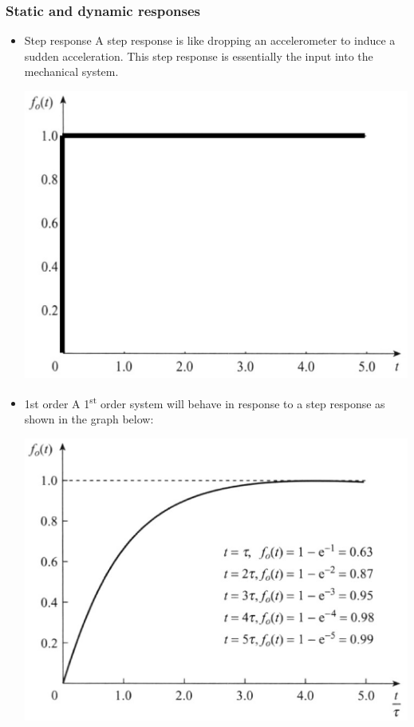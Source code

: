 \documentclass[11pt]{article}
\begin{document}
\subsubsection{Static and dynamic responses}
\label{sec:orgfb9a5f6}
\begin{itemize}
\item Step response
A step response is like dropping an accelerometer to induce a sudden acceleration. This step response is essentially the input into the mechanical system.

\begin{center}
\includegraphics[scale=0.4]{./images/step-response.png}
\end{center}

\item 1st order
A 1\textsuperscript{st} order system will behave in response to a step response as shown in the graph below:

\begin{center}
\includegraphics[scale=0.4]{./images/first-order-system-response.png}
\end{center}
\end{itemize}
\end{document}
